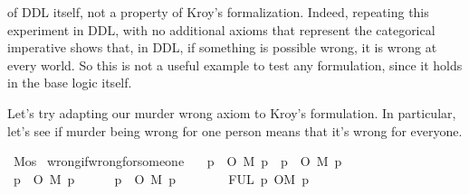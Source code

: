 \begin{isabellebody}
\begin{isamarkuptext}
of DDL itself, not a property of Kroy's formalization. Indeed, repeating this experiment in DDL, with no
additional axioms that represent the categorical imperative shows that, in DDL, if something is 
possible wrong, it is wrong at every world. So this is not a useful example to test any formulation,
since it holds in the base logic itself.%
\end{isamarkuptext}\isamarkuptrue%
%
\begin{isamarkuptext}%
Let's try adapting our murder wrong axiom to Kroy's formulation. In particular, let's see if 
murder being wrong for one person means that it's wrong for everyone.%
\end{isamarkuptext}\isamarkuptrue%
\isamarkupfalse%
\ M{}{\isacharcolon}{\isacharcolon}{\isachardoublequoteopen}os{\isachardoublequoteclose}\isanewline
%
\isanewline
\isanewline
{}\isamarkupfalse%
\ wrong{\isacharunderscore}if{\isacharunderscore}wrong{\isacharunderscore}for{\isacharunderscore}someone{\isacharcolon}\isanewline
\ \ \ {\isachardoublequoteopen}{\isacharparenleft}{\isasymexists}p{\isachardot}\ {\isasymTurnstile}\ O\ {\isacharbraceleft}\isactrlbold {\isasymnot}{\isacharparenleft}M{}\ p{\isacharparenright}{\isacharbraceright}{\isacharparenright}\ {\isasymlongrightarrow}\ {\isacharparenleft}{\isasymforall}p{\isachardot}\ {\isasymTurnstile}\ O\ {\isacharbraceleft}\isactrlbold {\isasymnot}{\isacharparenleft}M{}\ p{\isacharparenright}{\isacharbraceright}{\isacharparenright}{\isachardoublequoteclose}\isanewline
%
\isadelimproof
\ \ %
\endisadelimproof
%
\isatagproof
{}\isamarkupfalse%
\ \isanewline
\ \ \ \ \isamarkupfalse%
\ {\isachardoublequoteopen}{\isacharparenleft}{\isasymexists}p{\isachardot}\ {\isasymTurnstile}\ O\ {\isacharbraceleft}\isactrlbold {\isasymnot}{\isacharparenleft}M{}\ p{\isacharparenright}{\isacharbraceright}{\isacharparenright}{\isachardoublequoteclose}\isanewline
\ \ \ \ \isamarkupfalse%
\ {\isachardoublequoteopen}{\isacharparenleft}{\isasymforall}p{\isachardot}\ {\isasymTurnstile}\ O\ {\isacharbraceleft}\isactrlbold {\isasymnot}{\isacharparenleft}M{}\ p{\isacharparenright}{\isacharbraceright}{\isacharparenright}{\isachardoublequoteclose}\isanewline
\ \ \ \ \ \ \isamarkupfalse%
\ FUL\ {\isacartoucheopen}{\isasymexists}p{\isachardot}\ {\isasymTurnstile}\isactrlemph O{\isacharbraceleft}\isactrlemph {\isasymnot}M{}{\isacharbraceright}\ p{\isacartoucheclose}\ \isamarkupfalse%

\end{isabellebody}
